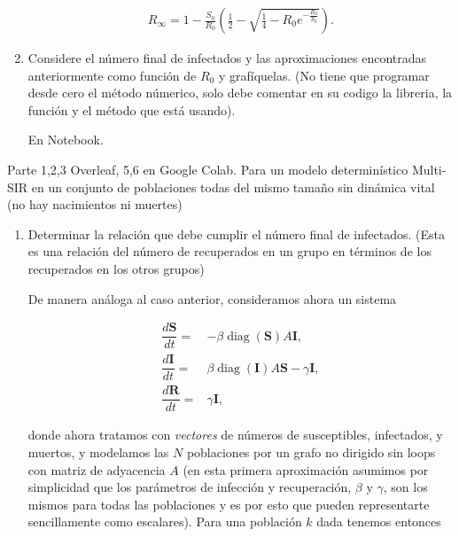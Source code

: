 \documentclass[answers]{exam}
\begin{document}
\begin{questions}
\begin{enumerate}
\begin{solution}
\begin{align*}
    R_\infty = 1 - \frac{S_0}{R_0}\left(\tfrac{1}{2} - \sqrt{\tfrac{1}{4} - 
    R_0e^{-\frac{R_0}{S_0}}}\right).
\end{align*}
\end{solution}

\item Considere el n\'umero final de infectados y las aproximaciones encontradas anteriormente como funci\'on de $R_0$ y grafíquelas. (No tiene que programar desde cero el m\'etodo n\'umerico, solo debe comentar en su codigo la libreria, la funci\'on y el m\'etodo que está usando).

\begin{solution}
En Notebook.
\end{solution}

\end{enumerate}

\question Parte 1,2,3 Overleaf, 5,6 en Google Colab.
Para un modelo determin\'istico Multi-SIR en un conjunto de poblaciones todas del mismo tama\~no  sin din\'amica vital (no hay nacimientos ni muertes)

\begin{enumerate}
\item  Determinar la relaci\'on que debe cumplir el n\'umero final de infectados. (Esta es una relaci\'on del n\'umero de recuperados en un grupo en t\'erminos de los recuperados en los otros grupos)

\begin{solution}
De manera análoga al caso anterior, consideramos ahora un sistema

\begin{align*}
     \dfrac{d\mathbf{S}}{dt}=&-\beta \operatorname{diag}(\mathbf{S})A\mathbf{I},\\
     \dfrac{d\mathbf{I}}{dt}=&\beta \operatorname{diag}(\mathbf{I})A\mathbf{S} -\gamma \mathbf{I},\\
     \dfrac{d\mathbf{R}}{dt}=&\gamma \mathbf{I},
\end{align*}

donde ahora tratamos con \emph{vectores} de números de susceptibles, infectados, y muertos, y modelamos las $N$ poblaciones por un grafo no dirigido sin loops con matriz de adyacencia $A$ (en esta primera aproximación asumimos por simplicidad que los parámetros de infección y recuperación, $\beta$ y $\gamma$, son los mismos para todas las poblaciones y es por esto que pueden representarte sencillamente como escalares). Para una población $k$ dada tenemos entonces


\end{solution}
\end{enumerate}
\end{questions}
\end{document}
